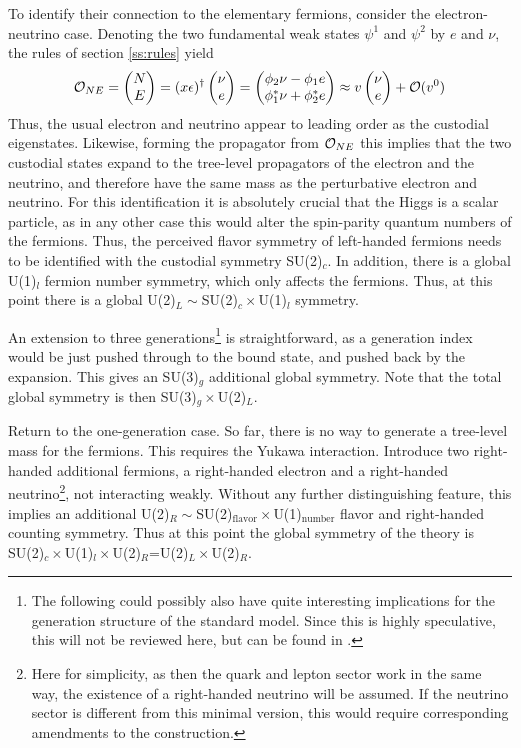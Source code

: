\documentclass[final,twoside,12pt]{article}
\newcommand*{\no}{\noindent}
\newcommand*{\be}{\begin{equation}}
\newcommand*{\ee}{\end{equation}}
\newcommand*{\1}{1\!\!\!\bot}
\newcommand*{\bma}{\begin{matrix}}
\newcommand*{\ema}{\end{matrix}}
\newcommand*{\bpm}{\left(\bma}
\newcommand*{\epm}{\ema\right)}
\newcommand*{\op}{{\cal O}}
\begin{document}
To identify their connection to the elementary fermions, consider the electron-neutrino case. Denoting the two fundamental weak states $\psi^1$ and $\psi^2$ by $e$ and $\nu$, the rules of section \ref{ss:rules} yield \cite{Frohlich:1980gj,Frohlich:1981yi,Egger:2017tkd}
\be
\mathcal{O}_{NE}=\bpm N\cr E\epm=(x\epsilon)^\dagger \bpm \nu \\ e \epm = \bpm \phi_2 \nu  -  \phi_1 e  \\  \phi_1^* \nu + \phi_2^* e  \epm\approx v\bpm \nu\cr e\epm+{\cal O}(v^0)\label{opfermexp}
\ee
\no Thus, the usual electron and neutrino appear to leading order as the custodial eigenstates. Likewise, forming the propagator from $\op_{NE}$ this implies that the two custodial states expand to the tree-level propagators of the electron and the neutrino, and therefore have the same mass as the perturbative electron and neutrino. For this identification it is absolutely crucial that the Higgs is a scalar particle, as in any other case this would alter the spin-parity quantum numbers of the fermions. Thus, the perceived flavor symmetry of left-handed fermions needs to be identified with the custodial symmetry SU(2)$_c$. In addition, there is a global U(1)$_l$ fermion number symmetry, which only affects the fermions. Thus, at this point there is a global U(2)$_L\sim$SU(2)$_c\times$U(1)$_l$ symmetry.

An extension to three generations\footnote{The following could possibly also have quite interesting implications for the generation structure of the standard model. Since this is highly speculative, this will not be reviewed here, but can be found in \cite{Egger:2017tkd}.} is straightforward, as a generation index would be just pushed through to the bound state, and pushed back by the expansion. This gives an SU(3)$_g$ additional global symmetry. Note that the total global symmetry is then SU(3)$_g\times$U(2)$_L$.

Return to the one-generation case. So far, there is no way to generate a tree-level mass for the fermions. This requires the Yukawa interaction. Introduce two right-handed additional fermions, a right-handed electron and a right-handed neutrino\footnote{Here for simplicity, as then the quark and lepton sector work in the same way, the existence of a right-handed neutrino will be assumed. If the neutrino sector is different from this minimal version, this would require corresponding amendments to the construction.}, not interacting weakly. Without any further distinguishing feature, this implies an additional U(2)$_R\sim$SU(2)$_\text{flavor}\times$U(1)$_\text{number}$ flavor and right-handed counting symmetry. Thus at this point the global symmetry of the theory is SU(2)$_c\times$U(1)$_l\times$U(2)$_R$=U(2)$_L\times$U(2)$_R$.
\end{document}
